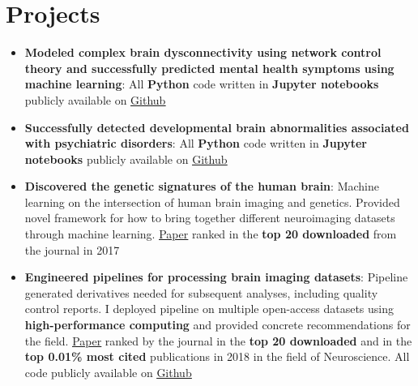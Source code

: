 \documentclass[letterpaper,10pt]{article}
\newcommand{\resumeItem}[2]{
  \item\small{
    \textbf{#1}{: #2 \vspace{-2pt}}
  }
}
\newcommand{\resumeSubItem}[2]{\resumeItem{#1}{#2}\vspace{-4pt}}
\newcommand{\resumeSubHeadingListStart}{\begin{itemize}[leftmargin=*]}
\newcommand{\resumeSubHeadingListEnd}{\end{itemize}}
\begin{document}
\section{Projects}
  \resumeSubHeadingListStart
    \resumeSubItem{Modeled complex brain dysconnectivity using network control theory and successfully predicted mental health symptoms using machine learning}
      {All \textbf{Python} code written in \textbf{Jupyter notebooks} publicly available on \href{https://github.com/lindenmp/neurodev_cs_predictive}{\underline{Github}}}
      \newline
    \resumeSubItem{Successfully detected developmental brain abnormalities associated with psychiatric disorders}
      {All \textbf{Python} code written in \textbf{Jupyter notebooks} publicly available on \href{https://github.com/lindenmp/normative_neurodev_cs_t1}{\underline{Github}}}
      \newline
    \resumeSubItem{Discovered the genetic signatures of the human brain}
      {Machine learning on the intersection of human brain imaging and genetics. Provided novel framework for how to bring together different neuroimaging datasets through machine learning. \href{https://onlinelibrary.wiley.com/doi/full/10.1111/gbb.12386}{\underline{Paper}} ranked in the \textbf{top 20 downloaded} from the journal in 2017}
      \newline
    \resumeSubItem{Engineered pipelines for processing brain imaging datasets}
      {Pipeline generated derivatives needed for subsequent analyses, including quality control reports. I deployed pipeline on multiple open-access datasets using \textbf{high-performance computing} and provided concrete recommendations for the field. \href{https://www.sciencedirect.com/science/article/pii/S1053811917310972}{\underline{Paper}} ranked by the journal in the \textbf{top 20 downloaded} and in the \textbf{top 0.01\% most cited} publications in 2018 in the field of Neuroscience. All code publicly available on \href{https://github.com/lindenmp/rs-fMRI}{\underline{Github}}}
      \newline
  \resumeSubHeadingListEnd
\end{document}
